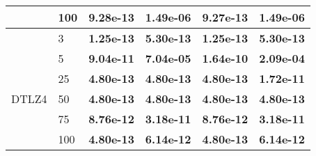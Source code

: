 \begin{table}[ht]
\begin{tabular}{l l r r r r}
&	100	&	\textbf{9.28e-13}&\textbf{1.49e-06}&\textbf{9.27e-13}&\textbf{1.49e-06}\\ 
\midrule 
&	3	&	\textbf{1.25e-13}&\textbf{5.30e-13}&\textbf{1.25e-13}&\textbf{5.30e-13}\\ 
&	5	&	\textbf{9.04e-11}&\textbf{7.04e-05}&\textbf{1.64e-10}&\textbf{2.09e-04}\\ 
&	25	&	\textbf{4.80e-13}&\textbf{4.80e-13}&\textbf{4.80e-13}&\textbf{1.72e-11}\\ 
DTLZ4&	50	&	\textbf{4.80e-13}&\textbf{4.80e-13}&\textbf{4.80e-13}&\textbf{4.80e-13}\\ 
&	75	&	\textbf{8.76e-12}&\textbf{3.18e-11}&\textbf{8.76e-12}&\textbf{3.18e-11}\\ 
&	100	&	\textbf{4.80e-13}&\textbf{6.14e-12}&\textbf{4.80e-13}&\textbf{6.14e-12}\\ 
\midrule 
\bottomrule
\end{tabular}
\endgroup
\end{table}
